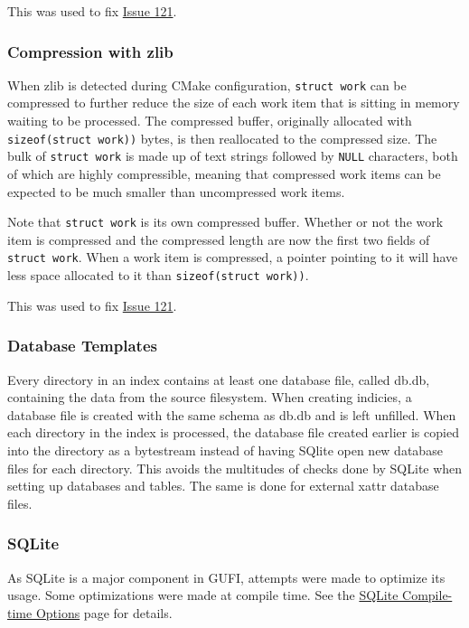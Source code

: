 This was used to fix
\href{https://github.com/mar-file-system/GUFI/issues/121}{Issue 121}.

\subsubsection{Compression with zlib}
When zlib is detected during CMake configuration, \texttt{struct~work}
can be compressed to further reduce the size of each work item that is
sitting in memory waiting to be processed. The compressed buffer,
originally allocated with \texttt{sizeof(struct~work))} bytes, is then
reallocated to the compressed size. The bulk of \texttt{struct~work}
is made up of text strings followed by \texttt{NULL} characters, both
of which are highly compressible, meaning that compressed work items
can be expected to be much smaller than uncompressed work items.

Note that \texttt{struct~work} is its own compressed buffer. Whether
or not the work item is compressed and the compressed length are now
the first two fields of \texttt{struct~work}. When a work item is
compressed, a pointer pointing to it will have less space allocated to
it than \texttt{sizeof(struct~work))}.

This was used to fix
\href{https://github.com/mar-file-system/GUFI/issues/121}{Issue 121}.

\subsubsection{Database Templates}
Every directory in an index contains at least one database file,
called db.db, containing the \lstat data from the source
filesystem. When creating indicies, a database file is created with
the same schema as db.db and is left unfilled. When each directory in
the index is processed, the database file created earlier is copied
into the directory as a bytestream instead of having SQlite open new
database files for each directory. This avoids the multitudes of
checks done by SQLite when setting up databases and tables. The same
is done for external xattr database files.

\subsubsection{SQLite}
As SQLite is a major component in GUFI, attempts were made to optimize
its usage. Some optimizations were made at compile time. See the
\href{https://www.sqlite.org/compile.html}{SQLite Compile-time
  Options} page for details.


